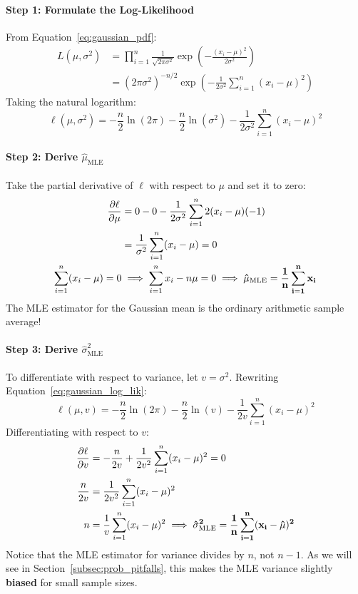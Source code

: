 \paragraph{Step 1: Formulate the Log-Likelihood}
From Equation~\eqref{eq:gaussian_pdf}:
\begin{align*}
L(\mu, \sigma^2) &= \prod_{i=1}^{n} \frac{1}{\sqrt{2\pi\sigma^2}} \exp\left( -\frac{(x_i - \mu)^2}{2\sigma^2} \right) \\
&= \left( 2\pi\sigma^2 \right)^{-n/2} \exp\left( -\frac{1}{2\sigma^2} \sum_{i=1}^{n} (x_i - \mu)^2 \right)
\end{align*}
Taking the natural logarithm:
\begin{equation}
\ell(\mu, \sigma^2) = -\frac{n}{2}\ln(2\pi) - \frac{n}{2}\ln(\sigma^2) - \frac{1}{2\sigma^2} \sum_{i=1}^{n} (x_i - \mu)^2\label{eq:gaussian_log_lik}
\end{equation}

\paragraph{Step 2: Derive $\hat{\mu}_{\text{MLE}}$}
Take the partial derivative of $\ell$ with respect to $\mu$ and set it to zero:
\begin{align}
\frac{\partial \ell}{\partial \mu} &= 0 - 0 - \frac{1}{2\sigma^2} \sum_{i=1}^{n} 2(x_i - \mu)(-1) \notag\\
&= \frac{1}{\sigma^2} \sum_{i=1}^{n} (x_i - \mu) = 0 \notag\\
\sum_{i=1}^{n} (x_i - \mu) = 0 &\implies \sum_{i=1}^{n} x_i - n\mu = 0 \implies \mathbf{\hat{\mu}_{\text{MLE}} = \frac{1}{n} \sum_{i=1}^{n} x_i}\label{eq:gaussian_mle_mean}
\end{align}
The MLE estimator for the Gaussian mean is the ordinary arithmetic sample average!

\paragraph{Step 3: Derive $\hat{\sigma}^2_{\text{MLE}}$}
To differentiate with respect to variance, let $v = \sigma^2$. Rewriting Equation~\eqref{eq:gaussian_log_lik}:
\begin{equation*}
\ell(\mu, v) = -\frac{n}{2}\ln(2\pi) - \frac{n}{2}\ln(v) - \frac{1}{2v} \sum_{i=1}^{n} (x_i - \mu)^2
\end{equation*}
Differentiating with respect to $v$:
\begin{align}
\frac{\partial \ell}{\partial v} &= -\frac{n}{2v} + \frac{1}{2v^2} \sum_{i=1}^{n} (x_i - \mu)^2 = 0 \notag\\
\frac{n}{2v} &= \frac{1}{2v^2} \sum_{i=1}^{n} (x_i - \mu)^2 \notag\\
n &= \frac{1}{v} \sum_{i=1}^{n} (x_i - \mu)^2 \implies \mathbf{\hat{\sigma}^2_{\text{MLE}} = \frac{1}{n} \sum_{i=1}^{n} (x_i - \hat{\mu})^2}\label{eq:gaussian_mle_variance}
\end{align}
Notice that the MLE estimator for variance divides by $n$, not $n - 1$. As we will see in Section~\ref{subsec:prob_pitfalls}, this makes the MLE variance slightly \textbf{biased} for small sample sizes.


